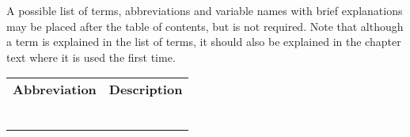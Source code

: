 A possible list of terms,
abbreviations and variable names with brief explanations may be placed
after the table of contents, but is not required. Note that although a term
is explained in the list of terms, it should also be explained in the
chapter text where it is used the first time. 
\begin{table}[h]
    \begin{tabular}{l l}
    \textbf{Abbreviation} & \textbf{Description} \\
                          &             \\
                          &             \\
                          &             \\
                          &             \\
                          &             \\
                          &            
    \end{tabular}
    \end{table}